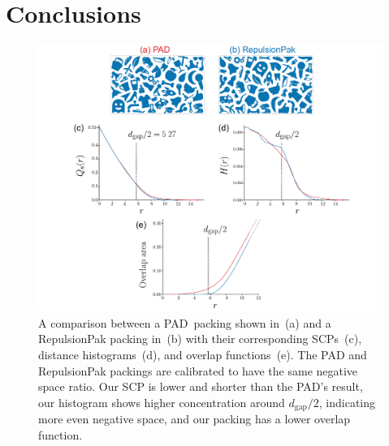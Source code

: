 \section{Conclusions}







\begin{figure}
\centering
\includegraphics[width=1.0\textwidth]{figures/metrics/pad_comparison_big.pdf}
\caption[A comparison between a PAD~packing and a RepulsionPak packing]
{\label{pad_comparison}
A comparison between a PAD~packing shown in~(a) and a RepulsionPak packing in~(b) 
with their corresponding SCPs~(c), distance histograms~(d), and overlap functions~(e). 
The PAD and RepulsionPak packings are calibrated
to have the same negative space ratio.
Our SCP is lower and shorter than the PAD's result,
our histogram shows higher concentration around $d_\mathrm{gap} / 2$,
indicating more even negative space,
and our packing has a lower overlap function.
}
\end{figure}


